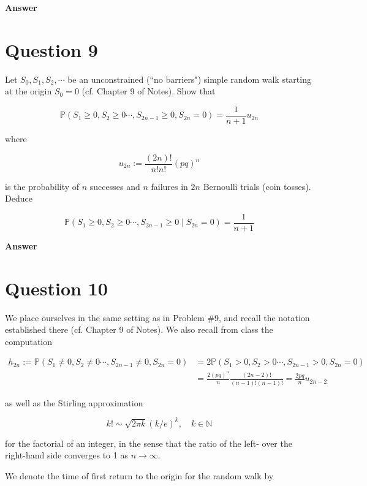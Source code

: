 \documentclass[letterpaper]{article}
\begin{document}
		\textbf{Answer}
		
		\clearpage
		
		\section{Question 9}
		
		Let $S_{0}, S_{1}, S_{2}, \cdots$ be an unconstrained (``no barriers") simple random walk starting at the origin $S_{0}=0$ (cf. Chapter 9 of Notes). Show that
		
		$$
		\mathbb{P}\left(S_{1} \geq 0, S_{2} \geq 0 \cdots, S_{2 n-1} \geq 0, S_{2 n}=0\right)=\frac{1}{n+1} u_{2 n}
		$$
		
		where
		
		$$
		u_{2 n}:=\frac{(2 n)!}{n!n!}(p q)^{n}
		$$
		
		is the probability of $n$ successes and $n$ failures in $2 n$ Bernoulli trials (coin tosses). Deduce
		
		$$
		\mathbb{P}\left(S_{1} \geq 0, S_{2} \geq 0 \cdots, S_{2 n-1} \geq 0 \mid S_{2 n}=0\right)=\frac{1}{n+1}
		$$
		
		\textbf{Answer}
		
		\clearpage
		
		\section{Question 10}
		
		We place ourselves in the same setting as in Problem \#9, and recall the notation established there (cf. Chapter 9 of Notes). We also recall from class the computation
		
		$$
		\begin{aligned}
			h_{2 n}:=\mathbb{P}\left(S_{1} \neq 0, S_{2} \neq 0 \cdots, S_{2 n-1} \neq 0, S_{2 n}=0\right) & =2 \mathbb{P}\left(S_{1}>0, S_{2}>0 \cdots, S_{2 n-1}>0, S_{2 n}=0\right) \\
			& =\frac{2(p q)^{n}}{n} \frac{(2 n-2)!}{(n-1)!(n-1)!}=\frac{2 p q}{n} u_{2 n-2}
		\end{aligned}
		$$
		
		as well as the Stirling approximation
		
		$$
		k!\sim \sqrt{2 \pi k}(k / e)^{k}, \quad k \in \mathbb{N}
		$$
		
		for the factorial of an integer, in the sense that the ratio of the left- over the right-hand side converges to 1 as $n \rightarrow \infty$.
		
		We denote the time of first return to the origin for the random walk by
		
\end{document}
